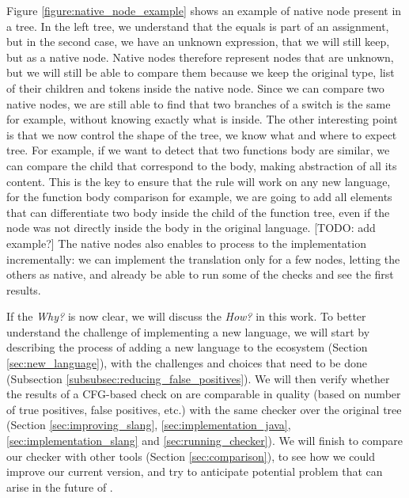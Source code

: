 Figure \ref{figure:native_node_example} shows an example of native node present in a \slang{} tree. In the left tree, we understand that the equals is part of an assignment, but in the second case, we have an unknown expression, that we will still keep, but as a native node.
Native nodes therefore represent nodes that are unknown, but we will still be able to compare them because we keep the original type, list of their children and tokens inside the native node. 
Since we can compare two native nodes, we are still able to find that two branches of a switch is the same for example, without knowing exactly what is inside. 
The other interesting point is that we now control the shape of the tree, we know what and where to expect tree. 
For example, if we want to detect that two functions body are similar, we can compare the child that correspond to the body, making abstraction of all its content.
This is the key to ensure that the rule will work on any new language, for the function body comparison for example, we are going to add all elements that can differentiate two body inside the child of the function tree, even if the node was not directly inside the body in the original language. [TODO: add example?]
The native nodes also enables to process to the implementation incrementally: we can implement the translation only for a few nodes, letting the others as native, and already be able to run some of the checks and see the first results.


If the \emph{Why?} is now clear, we will discuss the \emph{How?} in this work. 
To better understand the challenge of implementing a new language, we will start by describing the process of adding a new language to the ecosystem (Section \ref{sec:new_language}), with the challenges and choices that need to be done (Subsection \ref{subsubsec:reducing_false_positives}). 
We will then verify whether the results of a CFG-based check on \slang{} are comparable in quality (based on number of true positives, false positives, etc.) with the same checker over the original tree (Section \ref{sec:improving_slang}, \ref{sec:implementation_java}, \ref{sec:implementation_slang} and \ref{sec:running_checker}).
We will finish to compare our checker with other tools (Section \ref{sec:comparison}), to see how we could improve our current version, and try to anticipate potential problem that can arise in the future of \slang{}.




